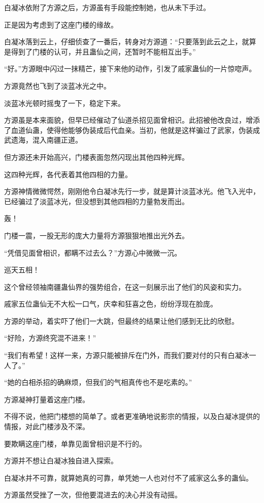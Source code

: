 \begin{this_body}
白凝冰依附了方源之后，方源虽有手段能控制她，也从未下手过。

正是因为考虑到了这座门楼的缘故。

白凝冰落到云上，仔细侦查了一番后，转身对方源道：“只要落到此云之上，就算是得到了门楼的认可，并且蛊仙之间，还暂时不能相互出手。”

“好。”方源眼中闪过一抹精芒，接下来他的动作，引发了戚家蛊仙的一片惊唿声。

方源竟然也飞到了淡蓝冰光之中。

淡蓝冰光顿时摇曳了一下，稳定下来。

方源虽是本来面貌，但早已经催动了仙道杀招见面曾相识。此招被他改良过，增添了血道仙蛊，使得他能够伪装成后代血亲。当初，他就是这样骗过了武家，伪装成武遗海，混入南疆正道。

但方源还未开始高兴，门楼表面忽然闪现出其他四种光辉。

这四种光辉，各代表着其他四相的力量。

方源神情微微愕然，刚刚他令白凝冰先行一步，就是算计淡蓝冰光。他飞入光中，已经骗过了淡蓝冰光，但没想到其他四相的力量勃发而出。

轰！

门楼一震，一股无形的庞大力量将方源狠狠地推出光外去。

“凭借见面曾相识，都瞒不过去么？”方源心中微微一沉。

巡天五相！

这个曾经领袖南疆蛊仙界的强势组合，在这一刻展示出了他们的风姿和实力。

戚家五位蛊仙无不大松一口气，庆幸和狂喜之色，纷纷浮现在脸庞。

方源的举动，着实吓了他们一大跳，但最终的结果让他们感到无比的欣慰。

“好险，方源终究混不进来！”

“我们有希望！这样一来，方源只能被排斥在门外，而我们要对付的只有白凝冰一人了。”

“她的白相杀招的确麻烦，但我们的气相真传也不是吃素的。”

方源凝神打量着这座门楼。

不得不说，他把门楼想的简单了。或者更准确地说影宗的情报，以及白凝冰提供的情报，对此门楼涉及不深。

要欺瞒这座门楼，单靠见面曾相识是不行的。

方源并不想让白凝冰独自进入探索。

白凝冰并不可靠，就算她真的可靠，单凭她一人也对付不了戚家这么多的蛊仙。

方源虽然受挫了一次，但他要混进去的决心并没有动摇。


\end{this_body}
